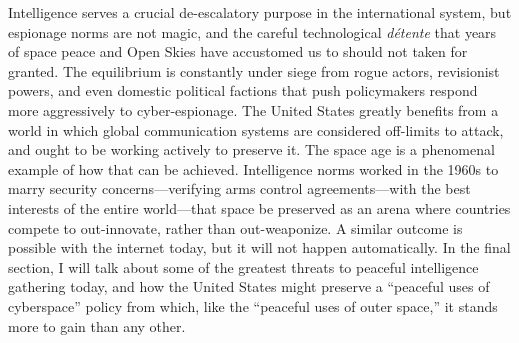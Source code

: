 \documentclass{memoir}
\begin{document}
Intelligence serves a crucial de-escalatory purpose in the international system, but espionage norms are not magic, and the careful technological \emph{d\'etente} that years of space peace and Open Skies have accustomed us to should not taken for granted. The equilibrium is constantly under siege from rogue actors, revisionist powers, and even domestic political factions that push policymakers respond more aggressively to cyber-espionage. The United States greatly benefits from a world in which global communication systems are considered off-limits to attack, and ought to be working actively to preserve it. The space age is a phenomenal example of how that can be achieved. Intelligence norms worked in the 1960s to marry security concerns---verifying arms control agreements---with the best interests of the entire world---that space be preserved as an arena where countries compete to out-innovate, rather than out-weaponize. A similar outcome is possible with the internet today, but it will not happen automatically. In the final section, I will talk about some of the greatest threats to peaceful intelligence gathering today, and how the United States might preserve a ``peaceful uses of cyberspace'' policy from which, like the ``peaceful uses of outer space,'' it stands more to gain than any other.


\newpage
\printbibliography[heading=subbibliography]
\end{document}
